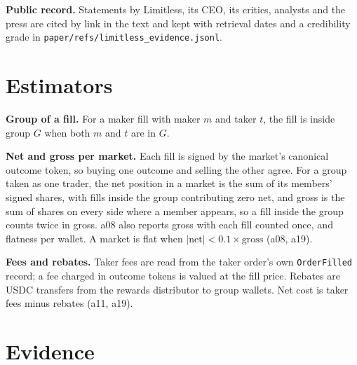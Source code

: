 \documentclass[11pt]{article}
\begin{document}
\textbf{Public record.} Statements by Limitless, its CEO, its critics, analysts and the press are cited by link in the text and kept with retrieval dates and a credibility grade in \nolinkurl{paper/refs/limitless_evidence.jsonl}.

\appendix

\section{Estimators}

\textbf{Group of a fill.} For a maker fill with maker $m$ and taker $t$, the fill is inside group $G$ when both $m$ and $t$ are in $G$.

\textbf{Net and gross per market.} Each fill is signed by the market's canonical outcome token, so buying one outcome and selling the other agree.
For a group taken as one trader, the net position in a market is the sum of its members' signed shares, with fills inside the group contributing zero net, and gross is the sum of shares on every side where a member appears, so a fill inside the group counts twice in gross. a08 also reports gross with each fill counted once, and flatness per wallet.
A market is flat when $|\mathrm{net}| < 0.1 \times \mathrm{gross}$ (a08, a19).

\textbf{Fees and rebates.} Taker fees are read from the taker order's own \texttt{OrderFilled} record; a fee charged in outcome tokens is valued at the fill price.
Rebates are USDC transfers from the rewards distributor to group wallets.
Net cost is taker fees minus rebates (a11, a19).

\section{Evidence}
\end{document}
